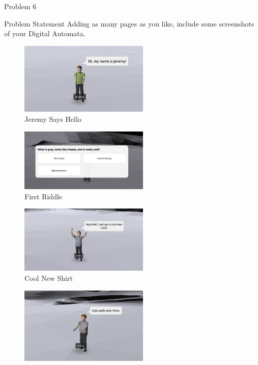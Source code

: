 \begin{problem}{Problem 6}
    \begin{statement}{Problem Statement}
        Adding as many pages as you like, include some screenshots of your Digital Automata.
    \end{statement}

    \begin{figure}[ht]
        \centering
        \includegraphics[width=0.55\textwidth]{./Images/Hello.png}
        \caption{Jeremy Says Hello}
    \end{figure}
    \begin{figure}[ht]
        \centering
        \includegraphics[width=0.55\textwidth]{./Images/First Riddle.png}
        \caption{First Riddle}
    \end{figure}
    \begin{figure}[ht]
        \centering
        \includegraphics[width=0.55\textwidth]{./Images/Cool New Shirt.png}
        \caption{Cool New Shirt}
    \end{figure}
    \begin{figure}[ht]
        \centering
        \includegraphics[width=0.55\textwidth]{./Images/Walking Over There.png}

\end{figure}
\end{problem}
